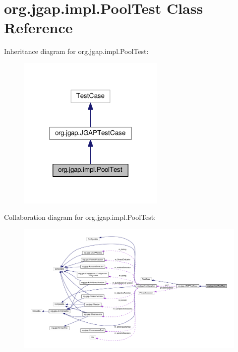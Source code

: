 \hypertarget{classorg_1_1jgap_1_1impl_1_1_pool_test}{\section{org.\-jgap.\-impl.\-Pool\-Test Class Reference}
\label{classorg_1_1jgap_1_1impl_1_1_pool_test}
}


Inheritance diagram for org.\-jgap.\-impl.\-Pool\-Test\-:
\nopagebreak
\begin{figure}[H]
\begin{center}
\leavevmode
\includegraphics[width=202pt]{classorg_1_1jgap_1_1impl_1_1_pool_test__inherit__graph}
\end{center}
\end{figure}


Collaboration diagram for org.\-jgap.\-impl.\-Pool\-Test\-:
\nopagebreak
\begin{figure}[H]
\begin{center}
\leavevmode
\includegraphics[width=350pt]{classorg_1_1jgap_1_1impl_1_1_pool_test__coll__graph}
\end{center}
\end{figure}
